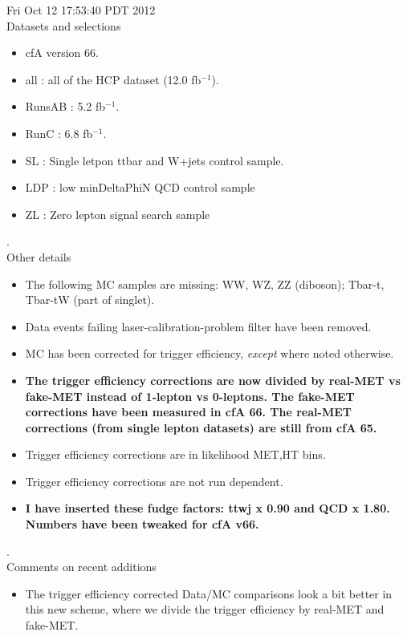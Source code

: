 \documentclass[11pt]{article}
\begin{document}
   Fri Oct 12 17:53:40 PDT 2012 \\

   Datasets and selections
   \begin{itemize}
     \item cfA version 66.
     \item all : all of the HCP dataset (12.0 fb$^{-1}$).
     \item RunsAB : 5.2 fb$^{-1}$.
     \item RunC : 6.8 fb$^{-1}$.
     \item SL : Single letpon ttbar and W+jets control sample.
     \item LDP : low minDeltaPhiN QCD control sample
     \item ZL : Zero lepton signal search sample
   \end{itemize}

.\\

   Other details
   \begin{itemize}
     \item The following MC samples are missing: WW, WZ, ZZ (diboson); Tbar-t, Tbar-tW (part of singlet).
     \item Data events failing laser-calibration-problem filter have been removed.
     \item MC has been corrected for trigger efficiency, {\it except} where noted otherwise.
     \item {\bf The trigger efficiency corrections are now divided by real-MET vs fake-MET
             instead of 1-lepton vs 0-leptons.  The fake-MET corrections have been
             measured in cfA 66.  The real-MET corrections (from single lepton datasets)
             are still from cfA 65. }
     \item Trigger efficiency corrections are in likelihood MET,HT bins.
     \item Trigger efficiency corrections are not run dependent.
     \item {\bf I have inserted these fudge factors: ttwj x 0.90 and QCD x 1.80.  Numbers have been tweaked for cfA v66.}
   \end{itemize}

.\\

  Comments on recent additions
  \begin{itemize}
    \item The trigger efficiency corrected Data/MC comparisons look a bit better in this
          new scheme, where we divide the trigger efficiency by real-MET and fake-MET.
   \end{itemize}
\end{document}
